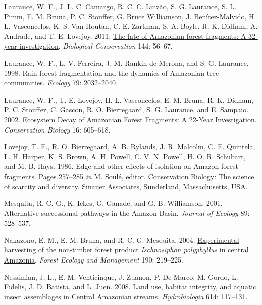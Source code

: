 \documentclass[
  12pt,
  man, donotrepeattitle]{apa6}
\newlength{\cslhangindent}
\newlength{\cslentryspacingunit} %
\newenvironment{CSLReferences}[2] %
 {%
  \setlength{\parindent}{0pt}
  \ifodd #1
  \let\oldpar\par
  \def\par{\hangindent=\cslhangindent\oldpar}
  \fi
  \setlength{\parskip}{#2\cslentryspacingunit}
 }%
 {}
\begin{document}
\begin{CSLReferences}{1}{0}
\leavevmode{}%
Laurance, W. F., J. L. C. Camargo, R. C. C. Luizão, S. G. Laurance, S. L. Pimm, E. M. Bruna, P. C. Stouffer, G. Bruce Williamson, J. Benítez-Malvido, H. L. Vasconcelos, K. S. Van Houtan, C. E. Zartman, S. A. Boyle, R. K. Didham, A. Andrade, and T. E. Lovejoy. 2011. \href{https://doi.org/10.1016/j.biocon.2010.09.021}{The fate of {Amazonian} forest fragments: {A} 32-year investigation}. \emph{Biological Conservation} 144: 56--67.

\leavevmode{}%
Laurance, W. F., L. V. Ferreira, J. M. Rankin de Merona, and S. G. Laurance. 1998. Rain forest fragmentation and the dynamics of {Amazonian} tree communities. \emph{Ecology} 79: 2032--2040.

\leavevmode{}%
Laurance, W. F., T. E. Lovejoy, H. L. Vasconcelos, E. M. Bruna, R. K. Didham, P. C. Stouffer, C. Gascon, R. O. Bierregaard, S. G. Laurance, and E. Sampaio. 2002. \href{https://doi.org/10.1046/j.1523-1739.2002.01025.x}{Ecosystem {Decay} of {Amazonian} {Forest} {Fragments}: A 22-{Year} {Investigation}}. \emph{Conservation Biology} 16: 605--618.

\leavevmode{}%
Lovejoy, T. E., R. O. Bierregaard, A. B. Rylands, J. R. Malcolm, C. E. Quintela, L. H. Harper, K. S. Brown, A. H. Powell, C. V. N. Powell, H. O. R. Schubart, and M. B. Hays. 1986. Edge and other effects of isolation on {Amazon} forest fragments. Pages 257--285 \emph{in} M. Soulé, editor. Conservation {Biology}: The science of scarcity and diversity. Sinauer Associates, Sunderland, Massachusetts, USA.

\leavevmode{}%
Mesquita, R. C. G., K. Ickes, G. Ganade, and G. B. Williamson. 2001. Alternative successional pathways in the {Amazon} {Basin}. \emph{Journal of Ecology} 89: 528--537.

\leavevmode{}%
Nakazono, E. M., E. M. Bruna, and R. C. G. Mesquita. 2004. \href{https://doi.org/10.1016/j.foreco.2003.10.013}{Experimental harvesting of the non-timber forest product \emph{{Ischnosiphon} polyphyllus} in central {Amazonia}}. \emph{Forest Ecology and Management} 190: 219--225.

\leavevmode{}%
Nessimian, J. L., E. M. Venticinque, J. Zuanon, P. De Marco, M. Gordo, L. Fidelis, J. D. Batista, and L. Juen. 2008. Land use, habitat integrity, and aquatic insect assemblages in {Central} {Amazonian} streams. \emph{Hydrobiologia} 614: 117--131.


\end{CSLReferences}
\end{document}
